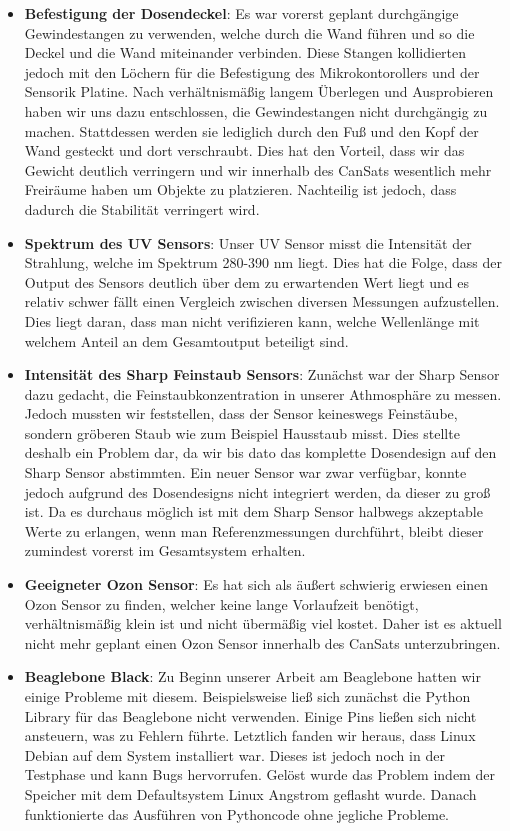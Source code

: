 \begin{itemize}
	\item \textbf{Befestigung der Dosendeckel}: Es war vorerst geplant durchgängige Gewindestangen zu verwenden, welche durch die Wand führen und so die Deckel und die Wand miteinander verbinden. Diese Stangen kollidierten jedoch mit den Löchern für die Befestigung des Mikrokontorollers und der Sensorik Platine. Nach verhältnismäßig langem Überlegen und Ausprobieren haben wir uns dazu entschlossen, die Gewindestangen nicht durchgängig zu machen. Stattdessen werden sie lediglich durch den Fuß und den Kopf der Wand gesteckt und dort verschraubt. Dies hat den Vorteil, dass wir das Gewicht deutlich verringern und wir innerhalb des CanSats wesentlich mehr Freiräume haben um Objekte zu platzieren. Nachteilig ist jedoch, dass dadurch die Stabilität verringert wird.
	\item \textbf{Spektrum des UV Sensors}: Unser UV Sensor misst die Intensität der Strahlung, welche im Spektrum 280-390 nm liegt. Dies hat die Folge, dass der Output des Sensors deutlich über dem zu erwartenden Wert liegt und es relativ schwer fällt einen Vergleich zwischen diversen Messungen aufzustellen. Dies liegt daran, dass man nicht verifizieren kann, welche Wellenlänge mit welchem Anteil an dem Gesamtoutput beteiligt sind.
	\item \textbf{Intensität des Sharp Feinstaub Sensors}: Zunächst war der Sharp Sensor dazu gedacht, die Feinstaubkonzentration in unserer Athmosphäre zu messen. Jedoch mussten wir feststellen, dass der Sensor keineswegs Feinstäube, sondern gröberen Staub wie zum Beispiel Hausstaub misst. Dies stellte deshalb ein Problem dar, da wir bis dato das komplette Dosendesign auf den Sharp Sensor abstimmten. Ein neuer Sensor war zwar verfügbar, konnte jedoch aufgrund des Dosendesigns nicht integriert werden, da dieser zu groß ist. Da es durchaus möglich ist mit dem Sharp Sensor halbwegs akzeptable Werte zu erlangen, wenn man Referenzmessungen durchführt, bleibt dieser zumindest vorerst im Gesamtsystem erhalten.
	\item \textbf{Geeigneter Ozon Sensor}: Es hat sich als äußert schwierig erwiesen einen Ozon Sensor zu finden, welcher keine lange Vorlaufzeit benötigt, verhältnismäßig klein ist und nicht übermäßig viel kostet. Daher ist es aktuell nicht mehr geplant einen Ozon Sensor innerhalb des CanSats unterzubringen.
	\item \textbf{Beaglebone Black}: Zu Beginn unserer Arbeit am Beaglebone hatten wir einige Probleme mit diesem. Beispielsweise ließ sich zunächst die Python Library für das Beaglebone nicht verwenden. Einige Pins ließen sich nicht ansteuern, was zu Fehlern führte. Letztlich fanden wir heraus, dass Linux Debian auf dem System installiert war. Dieses ist jedoch noch in der Testphase und kann Bugs hervorrufen. Gelöst wurde das Problem indem der Speicher mit dem Defaultsystem Linux Angstrom geflasht wurde. Danach funktionierte das Ausführen von Pythoncode ohne jegliche Probleme.

\end{itemize}
